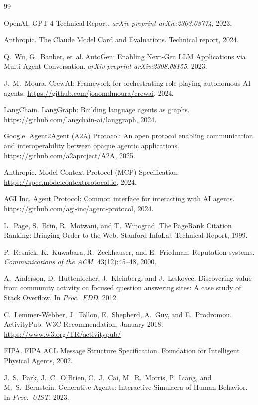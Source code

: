 \documentclass[11pt,a4paper]{article}
\begin{document}

\begin{thebibliography}{99}

OpenAI.
\newblock GPT-4 Technical Report.
\newblock \emph{arXiv preprint arXiv:2303.08774}, 2023.

Anthropic.
\newblock The Claude Model Card and Evaluations.
\newblock Technical report, 2024.

Q.~Wu, G.~Banber, et~al.
\newblock AutoGen: Enabling Next-Gen LLM Applications via Multi-Agent Conversation.
\newblock \emph{arXiv preprint arXiv:2308.08155}, 2023.

J.~M.~Moura.
\newblock CrewAI: Framework for orchestrating role-playing autonomous AI agents.
\newblock \url{https://github.com/joaomdmoura/crewai}, 2024.

LangChain.
\newblock LangGraph: Building language agents as graphs.
\newblock \url{https://github.com/langchain-ai/langgraph}, 2024.

Google.
\newblock Agent2Agent (A2A) Protocol: An open protocol enabling communication and interoperability between opaque agentic applications.
\newblock \url{https://github.com/a2aproject/A2A}, 2025.

Anthropic.
\newblock Model Context Protocol (MCP) Specification.
\newblock \url{https://spec.modelcontextprotocol.io}, 2024.

AGI Inc.
\newblock Agent Protocol: Common interface for interacting with AI agents.
\newblock \url{https://github.com/agi-inc/agent-protocol}, 2024.

L.~Page, S.~Brin, R.~Motwani, and T.~Winograd.
\newblock The PageRank Citation Ranking: Bringing Order to the Web.
\newblock Stanford InfoLab Technical Report, 1999.

P.~Resnick, K.~Kuwabara, R.~Zeckhauser, and E.~Friedman.
\newblock Reputation systems.
\newblock \emph{Communications of the ACM}, 43(12):45--48, 2000.

A.~Anderson, D.~Huttenlocher, J.~Kleinberg, and J.~Leskovec.
\newblock Discovering value from community activity on focused question answering sites: A case study of Stack Overflow.
\newblock In \emph{Proc.\ KDD}, 2012.

C.~Lemmer-Webber, J.~Tallon, E.~Shepherd, A.~Guy, and E.~Prodromou.
\newblock ActivityPub.
\newblock W3C Recommendation, January 2018.
\newblock \url{https://www.w3.org/TR/activitypub/}

FIPA.
\newblock FIPA ACL Message Structure Specification.
\newblock Foundation for Intelligent Physical Agents, 2002.

J.~S.~Park, J.~C.~O'Brien, C.~J.~Cai, M.~R.~Morris, P.~Liang, and M.~S.~Bernstein.
\newblock Generative Agents: Interactive Simulacra of Human Behavior.
\newblock In \emph{Proc.\ UIST}, 2023.

\end{thebibliography}
\end{document}
